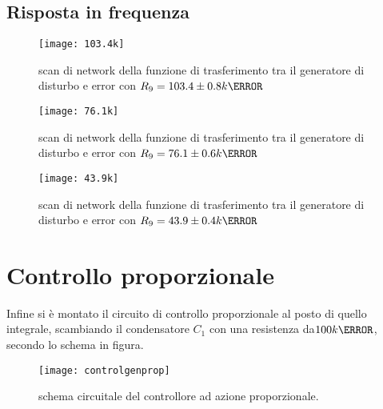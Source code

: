 \documentclass[10pt, a4paper, italian]{article}
\begin{document}
\subsection{Risposta in frequenza}
\begin{figure}[H]
    \centering
	\texttt{[image: 103.4k]}
    \caption{scan di network della funzione di trasferimento tra il generatore di disturbo e error con $R_9= 103.4 \pm 0.8 k\ohm$
    \label{fig: Draft1}}
\end{figure}
\begin{figure}[H]
    \centering
	\texttt{[image: 76.1k]}
    \caption{scan di network della funzione di trasferimento tra il generatore di disturbo e error con $R_9=76.1 \pm 0.6 k\ohm$
    \label{fig: Draft1}}
\end{figure}
\begin{figure}[H]
    \centering
	\texttt{[image: 43.9k]}
    \caption{scan di network della funzione di trasferimento tra il generatore di disturbo e error con $R_9= 43.9 \pm 0.4 k\ohm$
    \label{fig: Draft1}}
\end{figure}

\section{Controllo proporzionale}
Infine si è montato il circuito di controllo proporzionale al posto di quello integrale, scambiando il condensatore $C_1$ con una resistenza da$100 k\ohm$, secondo lo schema in figura.
\begin{figure}[H]
    \centering
	\texttt{[image: controlgenprop]}
    \caption{schema circuitale del controllore ad azione proporzionale.
    \label{fig: Draft1}}
\end{figure}
\end{document}
